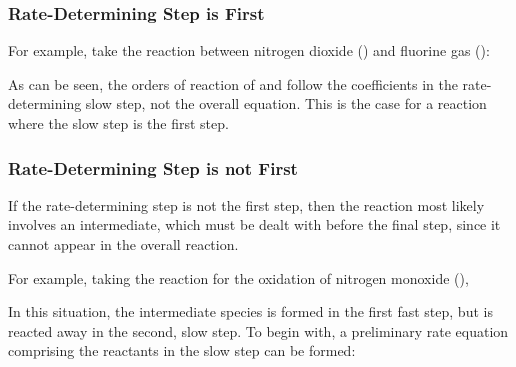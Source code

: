 			\subsubsection{Rate-Determining Step is First}

				For example, take the reaction between nitrogen dioxide () and fluorine gas ():


				As can be seen, the orders of reaction of  and  follow the coefficients in the rate-determining slow
				step, not the overall equation. This is the case for a reaction where the slow step is the first step.



			\subsubsection{Rate-Determining Step is not First}

				If the rate-determining step is not the first step, then the reaction most likely involves an intermediate, which must be
				dealt with before the final step, since it cannot appear in the overall reaction.

				For example, taking the reaction for the oxidation of nitrogen monoxide (),


				In this situation, the intermediate species  is formed in the first fast step, but is reacted away in the second,
				slow step. To begin with, a preliminary rate equation comprising the reactants in the slow step can be formed:


